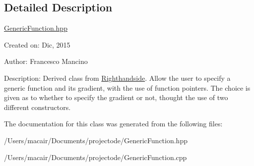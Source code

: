 \subsection{Detailed Description}
\hyperlink{_generic_function_8hpp_source}{Generic\+Function.\+hpp}

Created on\+: Dic, 2015 \begin{DoxyVerb}Author: Francesco Mancino
\end{DoxyVerb}


Description\+: Derived class from \hyperlink{class_righthandside}{Righthandside}. Allow the user to specify a generic function and its gradient, with the use of function pointers. The choice is given as to whether to specify the gradient or not, thought the use of two different constructors. 

The documentation for this class was generated from the following files\+:\begin{DoxyCompactItemize}
\item 
/\+Users/macair/\+Documents/projectode/Generic\+Function.\+hpp\item 
/\+Users/macair/\+Documents/projectode/Generic\+Function.\+cpp\end{DoxyCompactItemize}
